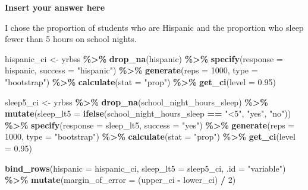 \documentclass[
]{article}
\newenvironment{Shaded}{\begin{snugshade}}{\end{snugshade}}
\newcommand{\AttributeTok}[1]{\textcolor[rgb]{0.13,0.29,0.53}{#1}}
\newcommand{\DecValTok}[1]{\textcolor[rgb]{0.00,0.00,0.81}{#1}}
\newcommand{\FloatTok}[1]{\textcolor[rgb]{0.00,0.00,0.81}{#1}}
\newcommand{\FunctionTok}[1]{\textcolor[rgb]{0.13,0.29,0.53}{\textbf{#1}}}
\newcommand{\NormalTok}[1]{#1}
\newcommand{\OtherTok}[1]{\textcolor[rgb]{0.56,0.35,0.01}{#1}}
\newcommand{\SpecialCharTok}[1]{\textcolor[rgb]{0.81,0.36,0.00}{\textbf{#1}}}
\newcommand{\StringTok}[1]{\textcolor[rgb]{0.31,0.60,0.02}{#1}}
\begin{document}
\textbf{Insert your answer here}

I chose the proportion of students who are Hispanic and the proportion
who sleep fewer than 5 hours on school nights.

\begin{Shaded}
\begin{Highlighting}[]
\NormalTok{hispanic\_ci }\OtherTok{\textless{}{-}}\NormalTok{ yrbss }\SpecialCharTok{\%\textgreater{}\%}
  \FunctionTok{drop\_na}\NormalTok{(hispanic) }\SpecialCharTok{\%\textgreater{}\%}
  \FunctionTok{specify}\NormalTok{(}\AttributeTok{response =}\NormalTok{ hispanic, }\AttributeTok{success =} \StringTok{"hispanic"}\NormalTok{) }\SpecialCharTok{\%\textgreater{}\%}
  \FunctionTok{generate}\NormalTok{(}\AttributeTok{reps =} \DecValTok{1000}\NormalTok{, }\AttributeTok{type =} \StringTok{"bootstrap"}\NormalTok{) }\SpecialCharTok{\%\textgreater{}\%}
  \FunctionTok{calculate}\NormalTok{(}\AttributeTok{stat =} \StringTok{"prop"}\NormalTok{) }\SpecialCharTok{\%\textgreater{}\%}
  \FunctionTok{get\_ci}\NormalTok{(}\AttributeTok{level =} \FloatTok{0.95}\NormalTok{)}

\NormalTok{sleep5\_ci }\OtherTok{\textless{}{-}}\NormalTok{ yrbss }\SpecialCharTok{\%\textgreater{}\%}
  \FunctionTok{drop\_na}\NormalTok{(school\_night\_hours\_sleep) }\SpecialCharTok{\%\textgreater{}\%}
  \FunctionTok{mutate}\NormalTok{(}\AttributeTok{sleep\_lt5 =} \FunctionTok{ifelse}\NormalTok{(school\_night\_hours\_sleep }\SpecialCharTok{==} \StringTok{"\textless{}5"}\NormalTok{, }\StringTok{"yes"}\NormalTok{, }\StringTok{"no"}\NormalTok{)) }\SpecialCharTok{\%\textgreater{}\%}
  \FunctionTok{specify}\NormalTok{(}\AttributeTok{response =}\NormalTok{ sleep\_lt5, }\AttributeTok{success =} \StringTok{"yes"}\NormalTok{) }\SpecialCharTok{\%\textgreater{}\%}
  \FunctionTok{generate}\NormalTok{(}\AttributeTok{reps =} \DecValTok{1000}\NormalTok{, }\AttributeTok{type =} \StringTok{"bootstrap"}\NormalTok{) }\SpecialCharTok{\%\textgreater{}\%}
  \FunctionTok{calculate}\NormalTok{(}\AttributeTok{stat =} \StringTok{"prop"}\NormalTok{) }\SpecialCharTok{\%\textgreater{}\%}
  \FunctionTok{get\_ci}\NormalTok{(}\AttributeTok{level =} \FloatTok{0.95}\NormalTok{)}

\FunctionTok{bind\_rows}\NormalTok{(}\AttributeTok{hispanic =}\NormalTok{ hispanic\_ci, }\AttributeTok{sleep\_lt5 =}\NormalTok{ sleep5\_ci, }\AttributeTok{.id =} \StringTok{"variable"}\NormalTok{) }\SpecialCharTok{\%\textgreater{}\%}
  \FunctionTok{mutate}\NormalTok{(}\AttributeTok{margin\_of\_error =}\NormalTok{ (upper\_ci }\SpecialCharTok{{-}}\NormalTok{ lower\_ci) }\SpecialCharTok{/} \DecValTok{2}\NormalTok{)}
\end{Highlighting}
\end{Shaded}
\end{document}
